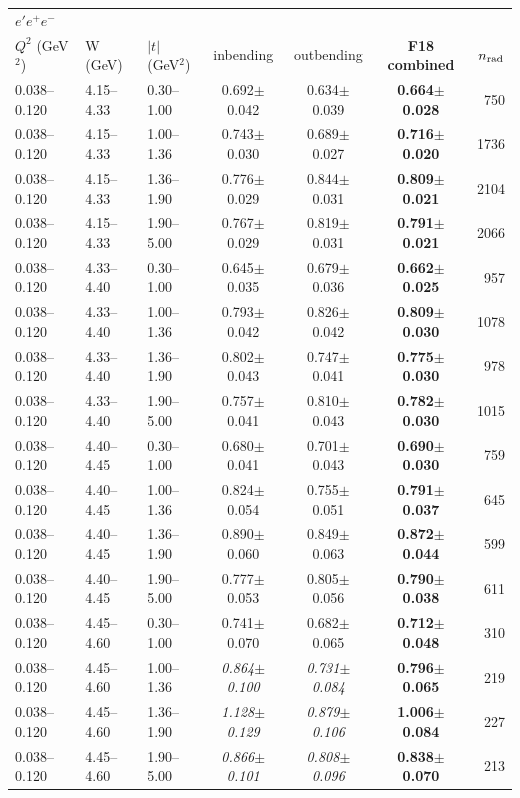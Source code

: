 \medskip

\begin{tabular}{lllcccr}\toprule
\multicolumn{7}{l}{$e'e^+e^-$}\\
$Q^2$ (GeV$^2$) & W (GeV) & $|t|$ (GeV$^2$) & inbending & outbending & \textbf{F18 combined} & $n_{\rm rad}$ \\\midrule
0.038--0.120 & 4.15--4.33 & 0.30--1.00 & 0.692$\pm$0.042 & 0.634$\pm$0.039 & \textbf{0.664$\pm$0.028} & 750 \\
0.038--0.120 & 4.15--4.33 & 1.00--1.36 & 0.743$\pm$0.030 & 0.689$\pm$0.027 & \textbf{0.716$\pm$0.020} & 1736 \\
0.038--0.120 & 4.15--4.33 & 1.36--1.90 & 0.776$\pm$0.029 & 0.844$\pm$0.031 & \textbf{0.809$\pm$0.021} & 2104 \\
0.038--0.120 & 4.15--4.33 & 1.90--5.00 & 0.767$\pm$0.029 & 0.819$\pm$0.031 & \textbf{0.791$\pm$0.021} & 2066 \\
0.038--0.120 & 4.33--4.40 & 0.30--1.00 & 0.645$\pm$0.035 & 0.679$\pm$0.036 & \textbf{0.662$\pm$0.025} & 957 \\
0.038--0.120 & 4.33--4.40 & 1.00--1.36 & 0.793$\pm$0.042 & 0.826$\pm$0.042 & \textbf{0.809$\pm$0.030} & 1078 \\
0.038--0.120 & 4.33--4.40 & 1.36--1.90 & 0.802$\pm$0.043 & 0.747$\pm$0.041 & \textbf{0.775$\pm$0.030} & 978 \\
0.038--0.120 & 4.33--4.40 & 1.90--5.00 & 0.757$\pm$0.041 & 0.810$\pm$0.043 & \textbf{0.782$\pm$0.030} & 1015 \\
0.038--0.120 & 4.40--4.45 & 0.30--1.00 & 0.680$\pm$0.041 & 0.701$\pm$0.043 & \textbf{0.690$\pm$0.030} & 759 \\
0.038--0.120 & 4.40--4.45 & 1.00--1.36 & 0.824$\pm$0.054 & 0.755$\pm$0.051 & \textbf{0.791$\pm$0.037} & 645 \\
0.038--0.120 & 4.40--4.45 & 1.36--1.90 & 0.890$\pm$0.060 & 0.849$\pm$0.063 & \textbf{0.872$\pm$0.044} & 599 \\
0.038--0.120 & 4.40--4.45 & 1.90--5.00 & 0.777$\pm$0.053 & 0.805$\pm$0.056 & \textbf{0.790$\pm$0.038} & 611 \\
0.038--0.120 & 4.45--4.60 & 0.30--1.00 & 0.741$\pm$0.070 & 0.682$\pm$0.065 & \textbf{0.712$\pm$0.048} & 310 \\
0.038--0.120 & 4.45--4.60 & 1.00--1.36 & \textit{0.864$\pm$0.100} & \textit{0.731$\pm$0.084} & \textbf{0.796$\pm$0.065} & 219 \\
0.038--0.120 & 4.45--4.60 & 1.36--1.90 & \textit{1.128$\pm$0.129} & \textit{0.879$\pm$0.106} & \textbf{1.006$\pm$0.084} & 227 \\
0.038--0.120 & 4.45--4.60 & 1.90--5.00 & \textit{0.866$\pm$0.101} & \textit{0.808$\pm$0.096} & \textbf{0.838$\pm$0.070} & 213 \\
\bottomrule\end{tabular}

\medskip

